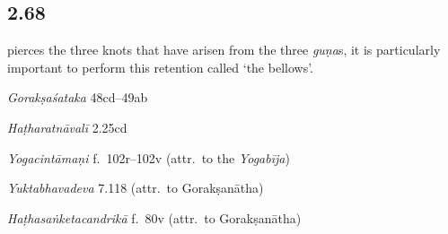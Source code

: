 \begin{ekdosis}
\subsection*{2.68}
\begin{translation}[hp02_068]
[and] pierces the three knots that have arisen from the three \emph{guṇa}s, it is particularly important to perform this retention called ‘the bellows’.
\end{translation}

\begin{sources}[hp02_068]
\emph{Gorakṣaśataka} 48cd–49ab

\begin{versinnote}
\end{versinnote}
\end{sources}

\begin{testimonia}[hp02_068]
\emph{Haṭharatnāvalī} 2.25cd

\begin{versinnote}
\end{versinnote}

\emph{Yogacintāmaṇi} f.~102r–102v (attr.~to the \emph{Yogabīja})

\begin{versinnote}
\end{versinnote}

\emph{Yuktabhavadeva} 7.118 (attr.~to Gorakṣanātha)

\begin{versinnote}
\end{versinnote}

\emph{Haṭhasaṅketacandrikā} f.~80v (attr.~to Gorakṣanātha)
\begin{versinnote}
\end{versinnote}


\end{testimonia}
\end{ekdosis}
